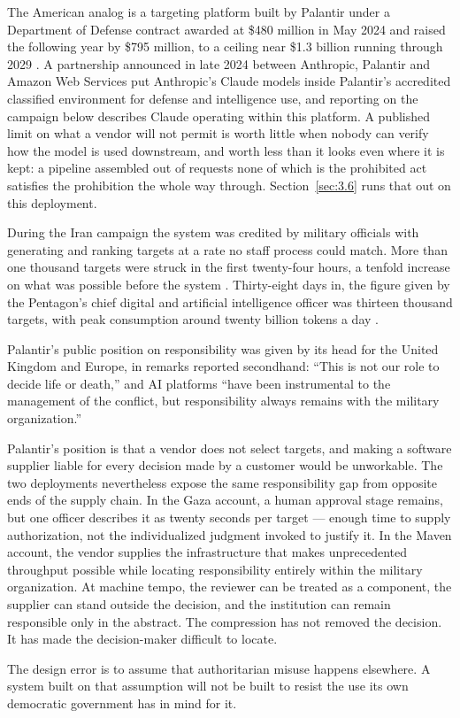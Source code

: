 \begin{esbox}
The American analog is a targeting platform built by Palantir under a Department of Defense contract awarded at \$480 million in May 2024 and raised the following year by \$795 million, to a ceiling near \$1.3 billion running through 2029 \autocite{defensescoop2025maven}. A partnership announced in late 2024 between Anthropic, Palantir and Amazon Web Services put Anthropic's Claude models inside Palantir's accredited classified environment for defense and intelligence use, and reporting on the campaign below describes Claude operating within this platform. A published limit on what a vendor will not permit is worth little when nobody can verify how the model is used downstream, and worth less than it looks even where it is kept: a pipeline assembled out of requests none of which is the prohibited act satisfies the prohibition the whole way through. Section~\ref{sec:3.6} runs that out on this deployment.

During the Iran campaign the system was credited by military officials with generating and ranking targets at a rate no staff process could match. More than one thousand targets were struck in the first twenty-four hours, a tenfold increase on what was possible before the system \autocite{csis2026maven}. Thirty-eight days in, the figure given by the Pentagon's chief digital and artificial intelligence officer was thirteen thousand targets, with peak consumption around twenty billion tokens a day \autocite{breakingdefense2026maven}.

Palantir's public position on responsibility was given by its head for the United Kingdom and Europe, in remarks reported secondhand: “This is not our role to decide life or death,” and AI platforms “have been instrumental to the management of the conflict, but responsibility always remains with the military organization.” \autocite{lee2026palantir}

\end{esbox}
Palantir's position is that a vendor does not select
targets, and making a software supplier liable for every decision made
by a customer would be unworkable. The two deployments nevertheless
expose the same responsibility gap from opposite ends of the supply
chain. In the Gaza account, a human approval stage remains, but one
officer describes it as twenty seconds per target — enough time to
supply authorization, not the individualized judgment invoked to
justify it. In the Maven account, the vendor supplies the infrastructure
that makes unprecedented throughput possible while locating
responsibility entirely within the military organization. At machine
tempo, the reviewer can be treated as a component, the supplier can
stand outside the decision, and the institution can remain responsible
only in the abstract. The compression has not removed the decision. It
has made the decision-maker difficult to locate.

The design error is to assume that authoritarian misuse happens elsewhere. A system built on that assumption will not be built to resist the use its own democratic government has in mind for it.

